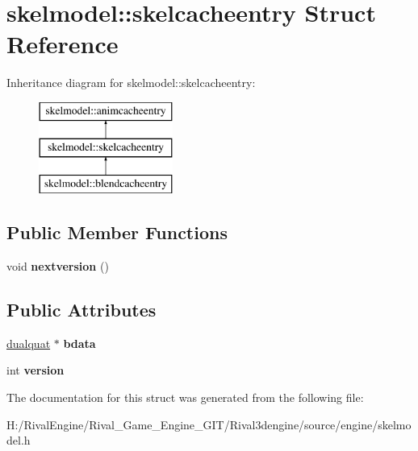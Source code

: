 \hypertarget{structskelmodel_1_1skelcacheentry}{}\section{skelmodel\+:\+:skelcacheentry Struct Reference}
\label{structskelmodel_1_1skelcacheentry}
Inheritance diagram for skelmodel\+:\+:skelcacheentry\+:\begin{figure}[H]
\begin{center}
\leavevmode
\includegraphics[height=3.000000cm]{structskelmodel_1_1skelcacheentry}
\end{center}
\end{figure}
\subsection*{Public Member Functions}
\begin{DoxyCompactItemize}
\item 
\mbox{\label{structskelmodel_1_1skelcacheentry_a3ebcc3c3f59d38bed2d09cefdb946419}} 
void {\bfseries nextversion} ()
\end{DoxyCompactItemize}
\subsection*{Public Attributes}
\begin{DoxyCompactItemize}
\item 
\mbox{\label{structskelmodel_1_1skelcacheentry_a6ca929462ff1770c2a2f69f65bed5a30}} 
\hyperlink{structdualquat}{dualquat} $\ast$ {\bfseries bdata}
\item 
\mbox{\label{structskelmodel_1_1skelcacheentry_ac6af88ceb369383f2b5ba58d9082a501}} 
int {\bfseries version}
\end{DoxyCompactItemize}


The documentation for this struct was generated from the following file\+:\begin{DoxyCompactItemize}
\item 
H\+:/\+Rival\+Engine/\+Rival\+\_\+\+Game\+\_\+\+Engine\+\_\+\+G\+I\+T/\+Rival3dengine/source/engine/skelmodel.\+h\end{DoxyCompactItemize}
